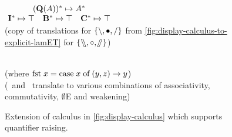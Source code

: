 \begin{figure}[hb]
\begin{mdframed}
\begin{pfbox}
    \end{pfbox}
    \\[1\baselineskip]
    \hrulefill
    \\[1\baselineskip]
    {
      \renewcommand{\arraystretch}{1.5}%
      \(\!
      \begin{array}{c c c}
        \multicolumn{3}{c}{\tr[({\q[A]})]\mapsto\tr[A]}\\
        \tr[\I]\mapsto\top      & \tr [\B]\mapsto\top     & \tr [\C]\mapsto\top\\
      \end{array}
      \)
    }
    \\[1\baselineskip]
    (copy of translations for $\{\mathbin{\backslash},\bullet,\mathbin{\slash}\}$ from
    \autoref{fig:display-calculus-to-explicit-lamET} for
    $\{\fatbslash,\mathbin{\circ},\!\!\fatslash\:\}$)
    \\[1\baselineskip]
    \begin{pfbox}
    \end{pfbox}
    \begin{pfbox}
    \end{pfbox}
    \begin{pfbox}
      \RightLabel{$\I^-$}
    \end{pfbox}
    \\[1\baselineskip]
    (where $\text{fst}\;x=\text{case}\;x\;\text{of}\;(y, z)\rightarrow y$)
    \\[1\baselineskip]
    (\B\ and \C\ translate to various combinations of associativity,
    commutativity, $\emptyset$E and weakening)
    \\
    \vspace*{\baselineskip}
  \end{mdframed}
  \caption{
    Extension of calculus in \autoref{fig:display-calculus} which
    supports quantifier raising.}%
  \label{fig:extension-quantifier-raising}
\end{figure}

